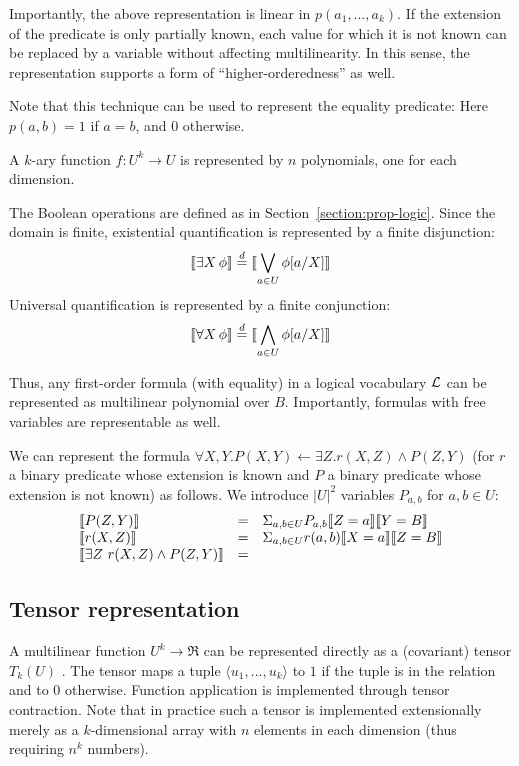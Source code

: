 \documentclass{article} %
\newcommand{\tuple}[1]{\(\langle #1\rangle\)}
\def\withmath#1{\relax\ifmmode#1\else{$ #1 $}\fi}
\def\defeq{\withmath{\stackrel{d}{=}}}
\begin{document}
Importantly, the above representation is linear in \(p(a_1, \ldots, a_k)\). If the extension of the predicate is only partially known, each value for which it is not known can be replaced by a variable without affecting multilinearity. In this sense, the representation supports a form of ``higher-orderedness'' as well.

Note that this technique can be used to represent the equality predicate: Here $p(a,b)=1$ if $a=b$, and $0$ otherwise.

A $k$-ary function $f:U^k \rightarrow U$ is represented by $n$ polynomials, one for each dimension.

The Boolean operations are defined as in Section~\ref{section:prop-logic}. Since the domain is finite, existential quantification is represented by a finite disjunction:
\begin{equation}
  \LL{\exists X \, \phi}\defeq \LL{\bigvee_{a \in U} \phi[a/X]}
\end{equation}
\noindent Universal quantification is represented by a finite conjunction:
\begin{equation}
  \LL{\forall X \, \phi} \defeq \LL{\bigwedge_{a \in U} \phi[a/X]}
\end{equation}

Thus, any first-order formula (with equality) in a logical vocabulary \({\cal L}\) can be represented as multilinear polynomial over \(B\). Importantly, formulas with free variables are representable as well.

\begin{example}
  We can represent the formula \(\forall X, Y. P(X,Y) \leftarrow \exists Z. r(X,Z) \wedge P(Z, Y) \) (for \(r\) a binary predicate whose extension is known and \(P\) a binary predicate whose extension is not known) as follows. We introduce \(|U|^2\) variables \(P_{a,b}\) for \(a,b\in U\):
  \[
  \begin{array}{lll}
    \llbracket P(Z,Y) \rrbracket &=& \Sigma_{a,b \in U} P_{a,b}  \llbracket Z=a \rrbracket \llbracket Y=B \rrbracket\\
    \llbracket r(X,Z) \rrbracket &=& \Sigma_{a,b \in U} r(a,b)  \llbracket X=a \rrbracket \llbracket Z=B \rrbracket\\    
    \llbracket \exists Z\ r(X,Z)\wedge P(Z,Y) \rrbracket &=& 
  \end{array}
  \]
\end{example}


\subsection{Tensor representation}
A multilinear function $U^k \rightarrow \Re$ can be represented directly as a (covariant) tensor $T_k(U)$ \cite[Chapter 8]{lee-book-2000}. The tensor maps a tuple \tuple{u_1,\ldots, u_k} to $1$ if the tuple is in the relation and to $0$ otherwise. Function application is implemented through tensor contraction. Note that in practice such a tensor is implemented extensionally merely as a \(k\)-dimensional array with \(n\) elements in each dimension (thus requiring \(n^k\) numbers). 
\end{document}

